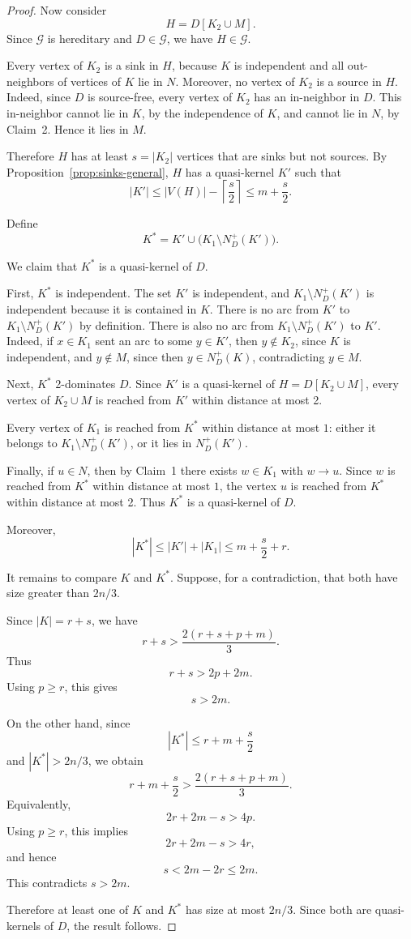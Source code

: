 \documentclass[10pt,a4paper]{amsart}
\begin{document}
\begin{proof}
Now consider
\[
    H=D[K_2\cup M].
\]
Since \(\mathcal G\) is hereditary and \(D\in\mathcal G\),
we have \(H\in\mathcal G\).

Every vertex of \(K_2\) is a sink in \(H\), because \(K\) is independent and
all out-neighbors of vertices of \(K\) lie in \(N\).
Moreover, no vertex of \(K_2\) is a source in \(H\).
Indeed, since \(D\) is source-free, every vertex of \(K_2\) has an
in-neighbor in \(D\). This in-neighbor cannot lie in \(K\), by the
independence of \(K\), and cannot lie in \(N\), by Claim~2.
Hence it lies in \(M\).

Therefore \(H\) has at least \(s=|K_2|\) vertices that are sinks but not
sources. By Proposition~\ref{prop:sinks-general}, \(H\) has a quasi-kernel
\(K'\) such that
\[
    |K'|
    \le
    |V(H)|-\left\lceil\frac s2\right\rceil
    \le
    m+\frac s2.
\]

Define
\[
    K^*
    =
    K'
    \cup
    \bigl(K_1\setminus N_D^+(K')\bigr).
\]

We claim that \(K^*\) is a quasi-kernel of \(D\).

First, \(K^*\) is independent.
The set \(K'\) is independent, and
\(K_1\setminus N_D^+(K')\) is independent because it is contained in \(K\).
There is no arc from \(K'\) to
\(K_1\setminus N_D^+(K')\) by definition.
There is also no arc from \(K_1\setminus N_D^+(K')\) to \(K'\).
Indeed, if \(x\in K_1\) sent an arc to some \(y\in K'\), then
\(y\notin K_2\), since \(K\) is independent, and
\(y\notin M\), since then \(y\in N_D^+(K)\), contradicting \(y\in M\).

Next, \(K^*\) 2-dominates \(D\).
Since \(K'\) is a quasi-kernel of \(H=D[K_2\cup M]\),
every vertex of \(K_2\cup M\) is reached from \(K'\) within distance at most 2.

Every vertex of \(K_1\) is reached from \(K^*\) within distance at most \(1\):
either it belongs to \(K_1\setminus N_D^+(K')\), or it lies in \(N_D^+(K')\).

Finally, if \(u\in N\), then by Claim~1 there exists \(w\in K_1\)
with \(w\to u\).
Since \(w\) is reached from \(K^*\) within distance at most \(1\),
the vertex \(u\) is reached from \(K^*\) within distance at most 2.
Thus \(K^*\) is a quasi-kernel of \(D\).

Moreover,
\[
    |K^*|
    \le
    |K'|+|K_1|
    \le
    m+\frac s2+r.
\]

It remains to compare \(K\) and \(K^*\).
Suppose, for a contradiction, that both have size greater than \(2n/3\).

Since \(|K|=r+s\), we have
\[
    r+s>\frac{2(r+s+p+m)}{3}.
\]
Thus
\[
    r+s>2p+2m.
\]
Using \(p\ge r\), this gives
\[
    s>2m.
\]

On the other hand, since
\[
    |K^*|\le r+m+\frac s2
\]
and \(|K^*|>2n/3\), we obtain
\[
    r+m+\frac s2>\frac{2(r+s+p+m)}{3}.
\]
Equivalently,
\[
    2r+2m-s>4p.
\]
Using \(p\ge r\), this implies
\[
    2r+2m-s>4r,
\]
and hence
\[
    s<2m-2r\le 2m.
\]
This contradicts \(s>2m\).

Therefore at least one of \(K\) and \(K^*\) has size at most \(2n/3\).
Since both are quasi-kernels of \(D\), the result follows.
\end{proof}
\end{document}

